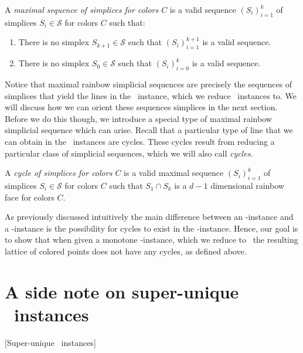 \begin{definition}
	A \emph{maximal sequence of simplices for colors $C$} is a valid sequence ${\left(S_i\right)}_{i=1}^{k}$ of simplices $S_i \in \mathcal{S}$ for colors $C$ such that:
	\begin{enumerate}
		\item There is no simplex $S_{k+1} \in \mathcal{S}$ such that ${\left(S_i\right)}_{i=1}^{k+1}$ is a valid sequence.
		\item There is no simplex $S_{0} \in \mathcal{S}$ such that ${\left(S_i\right)}_{i=0}^{k}$ is a valid sequence.
	\end{enumerate}
\end{definition}

Notice that maximal rainbow simplicial sequences are precisely the sequences of simplices that yield the lines in the \EndOfLine\ instance, which we reduce \Sperner\ instances to. We will discuss how we can orient these sequences simplices in the next section. Before we do this though, we introduce a special type of maximal rainbow simplicial sequence which can arise. Recall that a particular type of line that we can obtain in the \EndOfLine\ instances are cycles. These cycles result from reducing a particular class of simplicial sequences, which we will also call \emph{cycles}.

\begin{definition}[Cycle]
	A \emph{cycle of simplices for colors $C$} is a valid maximal sequence ${\left(S_i\right)}_{i=1}^{k}$ of simplices $S_i \in \mathcal{S}$ for colors $C$ such that $S_1 \cap S_k$ is a $d-1$ dimensional rainbow face for colors $C$.
\end{definition}

As previously discussed intuitively the main difference between an \EndOfLine-instance and a \EndOfPotentialLine-instance is the possibility for cycles to exist in the \EndOfLine-instance. Hence, our goal is to show that when given a monotone \Tarskistar-instance, which we reduce to \Sperner\ the resulting lattice of colored points does not have any cycles, as defined above.

\section{A side note on super-unique \Tarski\ instances}[Super-unique \Tarski\ instances]

